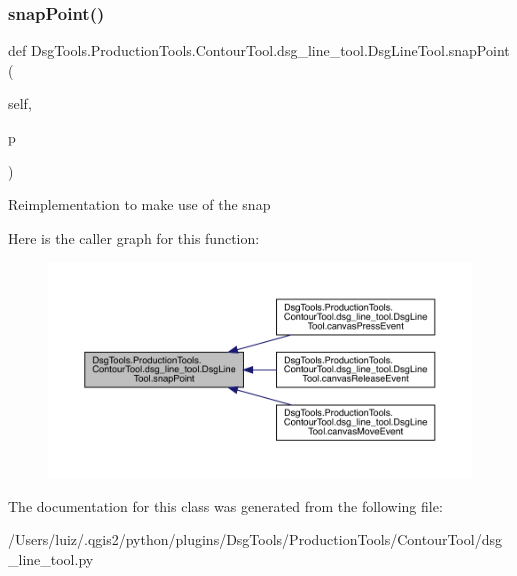 \subsubsection{\texorpdfstring{snap\+Point()}{snapPoint()}}
{\footnotesize\ttfamily def Dsg\+Tools.\+Production\+Tools.\+Contour\+Tool.\+dsg\+\_\+line\+\_\+tool.\+Dsg\+Line\+Tool.\+snap\+Point (\begin{DoxyParamCaption}\item[{}]{self,  }\item[{}]{p }\end{DoxyParamCaption})}

\begin{DoxyVerb}Reimplementation to make use of the snap
\end{DoxyVerb}
 Here is the caller graph for this function\+:
\nopagebreak
\begin{figure}[H]
\begin{center}
\leavevmode
\includegraphics[width=350pt]{class_dsg_tools_1_1_production_tools_1_1_contour_tool_1_1dsg__line__tool_1_1_dsg_line_tool_a72b2e8b035c640968acceefb07f61bc9_icgraph}
\end{center}
\end{figure}


The documentation for this class was generated from the following file\+:\begin{DoxyCompactItemize}
\item 
/\+Users/luiz/.\+qgis2/python/plugins/\+Dsg\+Tools/\+Production\+Tools/\+Contour\+Tool/dsg\+\_\+line\+\_\+tool.\+py\end{DoxyCompactItemize}
